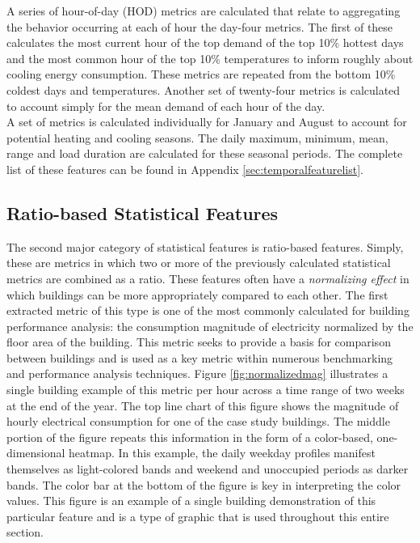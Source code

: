 A series of hour-of-day (HOD) metrics are calculated that relate to aggregating the behavior occurring at each of hour the day-four metrics. The first of these calculates the most current hour of the top demand of the top 10\% hottest days and the most common hour of the top 10\% temperatures to inform roughly about cooling energy consumption. These metrics are repeated from the bottom 10\% coldest days and temperatures. Another set of twenty-four metrics is calculated to account simply for the mean demand of each hour of the day.\\

A set of metrics is calculated individually for January and August to account for potential heating and cooling seasons. The daily maximum, minimum, mean, range and load duration are calculated for these seasonal periods. The complete list of these features can be found in Appendix \ref{sec:temporalfeaturelist}.


\subsection{Ratio-based Statistical Features}
\label{sec:ratiobasedfeatures}


The second major category of statistical features is ratio-based features. Simply, these are metrics in which two or more of the previously calculated statistical metrics are combined as a ratio. These features often have a \emph{normalizing effect} in which buildings can be more appropriately compared to each other. The first extracted metric of this type is one of the most commonly calculated for building performance analysis: the consumption magnitude of electricity normalized by the floor area of the building. This metric seeks to provide a basis for comparison between buildings and is used as a key metric within numerous benchmarking and performance analysis techniques. Figure \ref{fig:normalizedmag} illustrates a single building example of this metric per hour across a time range of two weeks at the end of the year. The top line chart of this figure shows the magnitude of hourly electrical consumption for one of the case study buildings. The middle portion of the figure repeats this information in the form of a color-based, one-dimensional heatmap. In this example, the daily weekday profiles manifest themselves as light-colored bands and weekend and unoccupied periods as darker bands. The color bar at the bottom of the figure is key in interpreting the color values. This figure is an example of a single building demonstration of this particular feature and is a type of graphic that is used throughout this entire section.

